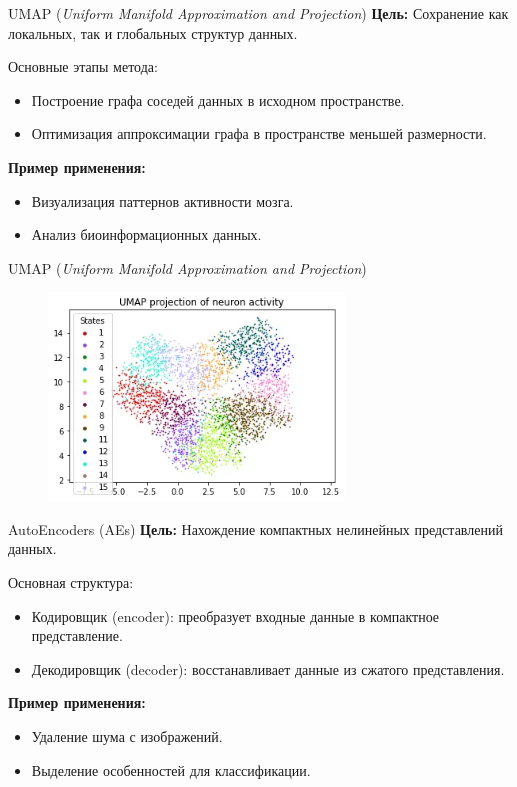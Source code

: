 \begin{frame}{UMAP (\textit{Uniform Manifold Approximation and Projection})}
    \textbf{Цель:} Сохранение как локальных, так и глобальных структур данных.

    Основные этапы метода:
    \begin{itemize}
        \item Построение графа соседей данных в исходном пространстве.
        \item Оптимизация аппроксимации графа в пространстве меньшей размерности.
    \end{itemize}

    \textbf{Пример применения:}
    \begin{itemize}
        \item Визуализация паттернов активности мозга.
        \item Анализ биоинформационных данных.
    \end{itemize}
\end{frame}

\begin{frame}{UMAP (\textit{Uniform Manifold Approximation and Projection})}
    \begin{figure}
        \centering
        \includegraphics[width=0.7\textwidth]{../resources/methods/umap.png}
    \end{figure}
\end{frame}

\begin{frame}{AutoEncoders (AEs)}
    \textbf{Цель:} Нахождение компактных нелинейных представлений данных.

    Основная структура:
    \begin{itemize}
        \item Кодировщик (encoder): преобразует входные данные в компактное представление.
        \item Декодировщик (decoder): восстанавливает данные из сжатого представления.
    \end{itemize}

    \textbf{Пример применения:}
    \begin{itemize}
        \item Удаление шума с изображений.
        \item Выделение особенностей для классификации.
    \end{itemize}
\end{frame}

